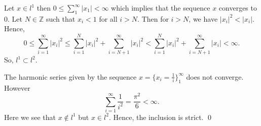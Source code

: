 
\begin{solution}
    Let $x\in l^1$ then $0\leq\sum_1^\infty{|x_1|}<\infty$
    which implies that the sequence $x$ converges to $0$. Let $N\in\mathbb{Z}$
    such that $x_i<1$ for all $i>N$. Then for $i>N$, we have
    $|x_i|^2<|x_i|$. Hence,
    $$0\leq \sum_{i=1}^{\infty}{|x_i|^2}
    \leq \sum_{i=1}^{N}{|x_i|^2}+
    \sum_{i=N+1}^{\infty}{|x_i|^2}<\sum_{i=1}^{N}{|x_i|^2}+
    \sum_{i=N+1}^{\infty}{|x_i|}<\infty.$$
    So, $l^1\subset l^2$.

    \setlength{\parskip}{3mm}
    The harmonic series given by the sequence
    $x=\{x_i=\frac{1}{i}\}_1^{\infty}$ does not converge.
    However $$\sum_{i=1}^{\infty}{\frac{1}{i^2}}
    =\frac{\pi^2}{6}<\infty.$$
    Here we see that $x\notin l^1$ but $x\in l^2$. Hence,
    the inclusion is strict.
    \qed
\end{solution}